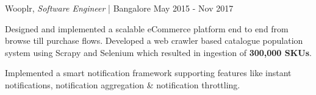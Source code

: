 \begin{cventries2}


  \cventrynew
    {Wooplr, \textnormal{\textit{Software Engineer} | Bangalore }} %
    {May 2015 - Nov 2017} %
    {
      \begin{cvitems} %
        \item {Designed and implemented a scalable eCommerce platform end to end from browse till purchase flows. Developed a web crawler based catalogue population system using Scrapy and Selenium which resulted in ingestion of \textbf{300,000 SKUs}.}
        \item {Implemented a smart notification framework supporting features like instant notifications, notification aggregation \& notification throttling.}
      \end{cvitems}
    }


\end{cventries2}
